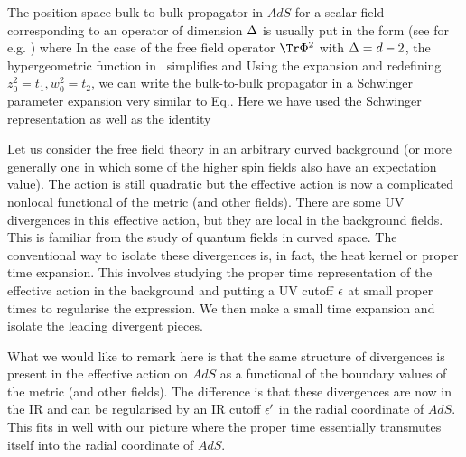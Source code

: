 
The position space bulk-to-bulk propagator in $AdS$ for a scalar field 
corresponding to an operator of dimension ${\Delta}$ is usually put in the form (see for e.g. \liu ) 
\eqn{}
where 
\eqn{}  
In the case of the free field operator $\Tr\Phi^2$
with ${\Delta}=d-2$, the hypergeometric function in \btob\ 
simplifies and
\eqn{}
Using the expansion 
\eqn{}
and redefining $z_0^2=t_1, w_0^2=t_2$, we can write the bulk-to-bulk propagator in
a Schwinger parameter expansion very similar to Eq.\htk .
\eqn{}
Here we have used the Schwinger representation
\eqn{}
as well as the identity
\eqn{}



Let us consider the free field theory in an arbitrary curved background (or more generally one in 
which some of the higher spin fields also have an expectation value). The action is still quadratic
but the effective action is now a complicated nonlocal functional of the metric (and other fields). 
There are some UV divergences in this effective action, but they are local in the 
background fields. This is familiar from the study of quantum fields in curved space.
The conventional way to isolate these divergences is, in fact, the heat kernel or proper time expansion. 
This involves studying the proper time representation of the effective action in the background and 
putting a UV cutoff ${\epsilon}$ at small proper times to regularise the expression. We then make a 
small time expansion and isolate the leading divergent pieces.  

What we would like to remark here is that the same structure of divergences is present in the 
effective action on $AdS$ as a functional of the boundary values of the metric (and other fields). 
The difference is that these divergences are now in the IR and can be regularised by an IR cutoff 
${\epsilon^{\prime}}$ in the radial coordinate of $AdS$. This fits in well with our picture where the proper time 
essentially transmutes itself into the radial coordinate of $AdS$. 

